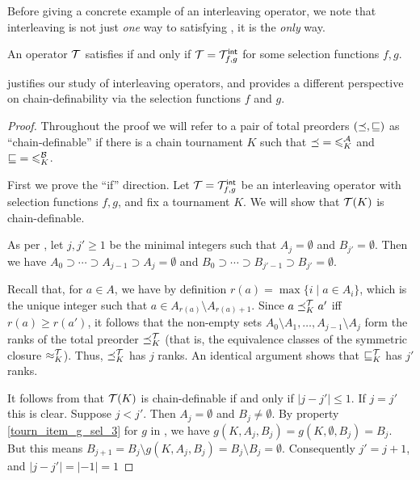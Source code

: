 Before giving a concrete example of an interleaving operator, we note that
interleaving is not just \emph{one} way to satisfying \chaindef{}, it
is the \emph{only} way.

\begin{theorem}
   \label{tourn_result_chaindef_iff_interleaving}

    An operator $\mathcal{T}$ satisfies \chaindef{} if and only if $\mathcal{T} =
    {\mathcal{T}_{f,g}^\mathsf{int}}$ for some selection functions $f, g$.

\end{theorem}

 justifies our study of interleaving
operators, and provides a different perspective on chain-definability via the
selection functions $f$ and $g$.

\begin{proof}

    Throughout the proof we will refer to a pair of total preorders
    $({\preceq}, {\sqsubseteq})$ as ``chain-definable'' if there is a chain tournament $K$
    such that ${\preceq} = {\leqslant^{\mathcal{A}}_K}$ and ${\sqsubseteq} = {\leqslant^{\mathcal{B}}_K}$.

    First we prove the ``if'' direction. Let $\mathcal{T} = {\mathcal{T}_{f,g}^\mathsf{int}}$ be an
    interleaving operator with selection functions $f, g$, and fix a
    tournament $K$. We will show that $\mathcal{T}(K)$ is chain-definable.

    As per , let $j, j' \ge 1$ be the
    minimal integers such that $A_j = \emptyset$ and $B_{j'} = \emptyset$. Then
    we have $A_0 \supset \cdots \supset A_{j-1} \supset A_j = \emptyset$ and
    $B_0 \supset \cdots \supset B_{j'-1} \supset B_{j'} = \emptyset$.

    Recall that, for $a \in A$, we have by definition $r(a) = \max\{i \mid a
    \in A_i\}$, which is the unique integer such that $a \in A_{r(a)} \setminus
    A_{{r(a)}+1}$. Since $a \preceq_K^{\mathcal{T}} a'$ iff $r(a) \ge r(a')$, it follows
    that the non-empty sets $A_0 \setminus A_1, \ldots, A_{j-1} \setminus A_j$
    form the ranks of the total preorder ${\preceq_K^{\mathcal{T}}}$ (that is, the
    equivalence classes of the symmetric closure ${\approx_K^{\mathcal{T}}}$). Thus,
    ${\preceq_K^{\mathcal{T}}}$ has $j$ ranks. An identical argument shows that
    ${\sqsubseteq_K^{\mathcal{T}}}$ has $j'$ ranks.

    It follows from  that $\mathcal{T}(K)$
    is chain-definable if and only if $|j - j'| \le 1$.  If $j = j'$ this is
    clear. Suppose $j < j'$.  Then $A_j = \emptyset$ and $B_j \ne \emptyset$.
    By property \cref{tourn_item_g_sel_3} for $g$ in
    , we have $g(K, A_j, B_j) = g(K, \emptyset,
    B_j) = B_j$. But this means $B_{j+1} = B_j \setminus g(K, A_j, B_j) = B_j
    \setminus B_j = \emptyset$.  Consequently $j' = j+1$, and $|j - j'| = |-1|
    = 1$


\end{proof}
